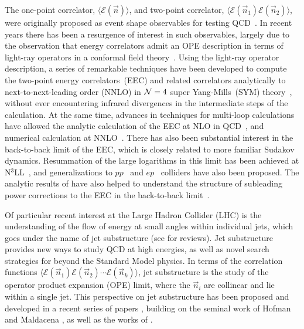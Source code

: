 \documentclass[letterpaper,11pt]{article}
\begin{document}
The one-point correlator, $\langle \mathcal{E}(\vec n)\rangle$, and two-point correlator, $\langle \mathcal{E}(\vec n_1) \mathcal{E}(\vec n_2)\rangle$, were originally proposed as event shape observables for testing QCD~\cite{Basham:1978zq,Basham:1978bw}. In recent years there has been a resurgence of interest in such observables, largely due to the observation that energy correlators admit an OPE description in terms of light-ray operators in a conformal field theory~\cite{Hofman:2008ar}. Using the light-ray operator description, a series of remarkable techniques have been developed to compute the two-point energy correlators~(EEC) and related correlators analytically to next-to-next-leading order (NNLO) in ${\cal N}=4$ super Yang-Mills~(SYM) theory~\cite{Belitsky:2013xxa,Belitsky:2013bja,Belitsky:2013ofa,Henn:2019gkr,Chicherin:2020azt}, without ever encountering infrared divergences in the intermediate steps of the calculation. At the same time, advances in techniques for multi-loop calculations have allowed the analytic calculation of the EEC at NLO in QCD~\cite{Dixon:2018qgp,Luo:2019nig,Gao:2020vyx}, and numerical calculation at NNLO~\cite{DelDuca:2016csb,DelDuca:2016ily}. There has also been substantial interest in the back-to-back limit of the EEC, which is closely related to more familiar Sudakov dynamics. Resummation of the large logarithms in this limit has been achieved at N$^3$LL~\cite{Moult:2018jzp,Ebert:2020sfi}, and generalizations to $pp$~\cite{Gao:2019ojf} and $ep$~\cite{Li:2020bub,Li:2021txc} colliders have also been proposed. The analytic results of \cite{Henn:2019gkr} have also helped to understand the structure of subleading power corrections to the EEC in the back-to-back limit~\cite{Moult:2019vou}.


Of particular recent interest at the Large Hadron Collider (LHC) is the understanding of the flow of energy at small angles within individual jets, which goes under the name of jet substructure (see \cite{Larkoski:2017jix,Asquith:2018igt,Marzani:2019hun} for reviews). Jet substructure provides new ways to study QCD at high energies, as well as novel search strategies for beyond the Standard Model physics. In terms of the correlation functions $\langle \mathcal{E}(\vec n_1) \mathcal{E}(\vec n_2) \cdots \mathcal{E}(\vec n_k) \rangle$, jet substructure is the study of the operator product expansion (OPE) limit, where the $\vec n_i$ are collinear and lie within a single jet. This perspective on jet substructure has  been proposed and developed in a recent series of papers \cite{Dixon:2019uzg,Chen:2019bpb,Chen:2020vvp,Chen:2020adz}, building on the seminal work of Hofman and Maldacena \cite{Hofman:2008ar}, as well as the works of \cite{Belitsky:2013xxa,Belitsky:2013bja,Belitsky:2013ofa}.
\end{document}
